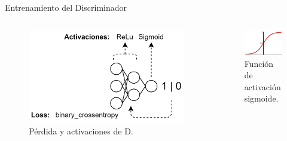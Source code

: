 \begin{frame}{Entrenamiento del Discriminador}
    \begin{columns}[T]
    \begin{column}{.55\textwidth}
    
    \begin{figure}
        \centering
        \includegraphics[width=\textwidth]{Slides/figures/GAN/Discriminador Red.png}
        \caption{Pérdida y activaciones de D.}
    \end{figure}
    
    \end{column}
    \hfill
    \begin{column}{.45\textwidth}
    
    \begin{figure}
        \centering
        \includegraphics[width=\textwidth]{Slides/figures/GAN/Sigmoid.jpg}
        \caption{Función de activación sigmoide.}
    \end{figure}
    

\end{column}
\end{columns}
\end{frame}
